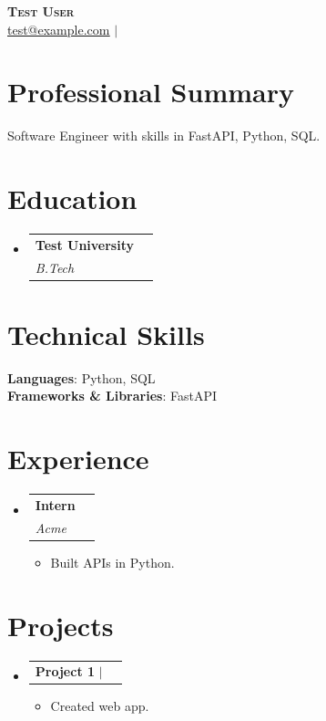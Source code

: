 \documentclass[letterpaper,10pt]{article}
\makeatletter
\newcommand{\resumeItem}[1]{
  \item\small{
    {#1 \vspace{-2pt}}
  }
}
\newcommand{\resumeSubheading}[4]{
  \vspace{-2pt}\item
    \begin{tabular*}{0.97\textwidth}[t]{l@{\extracolsep{\fill}}r}
      \textbf{#1} & #2 \\
      \textit{\small#3} & \textit{\small #4} \\
    \end{tabular*}\vspace{-7pt}
}
\newcommand{\resumeProjectHeading}[2]{
    \item
    \begin{tabular*}{0.97\textwidth}{l@{\extracolsep{\fill}}r}
      \small#1 & #2 \\
    \end{tabular*}\vspace{-7pt}
}
\newcommand{\resumeSubHeadingListStart}{\begin{itemize}[leftmargin=0.15in, label={}]}
\newcommand{\resumeSubHeadingListEnd}{\end{itemize}}
\newcommand{\resumeItemListStart}{\begin{itemize}}
\newcommand{\resumeItemListEnd}{\end{itemize}\vspace{-5pt}}
\makeatother
\begin{document}
\begin{center}
    \textbf{\Huge \scshape Test User} \\ \vspace{2pt}
    \small 
        \href{mailto:test@example.com}{\underline{test@example.com}} $|$             \end{center}

\section{Professional Summary}
\small{Software Engineer with skills in FastAPI, Python, SQL.}
\vspace{2pt}

\section{Education}
  \resumeSubHeadingListStart
          \resumeSubheading
        {Test University}{}
        {B.Tech}{}
      \resumeSubHeadingListEnd

\section{Technical Skills}
 \begin{itemize}[leftmargin=0.15in, label={}]
    \small{\item{
                        \textbf{Languages}: Python, SQL \\
                                \textbf{Frameworks & Libraries}: FastAPI \\
                                                            }}
 \end{itemize}

\section{Experience}
  \resumeSubHeadingListStart
          \resumeSubheading
        {Intern}{}
        {Acme}{}
        \resumeItemListStart
                      \resumeItem{Built APIs in Python.}
                  \resumeItemListEnd
      \resumeSubHeadingListEnd

\section{Projects}
    \resumeSubHeadingListStart
              \resumeProjectHeading
          {\textbf{Project 1} $|$ \emph{}}{}
          \resumeItemListStart
                          \resumeItem{Created web app.}
                      \resumeItemListEnd
          \resumeSubHeadingListEnd

\end{document}
